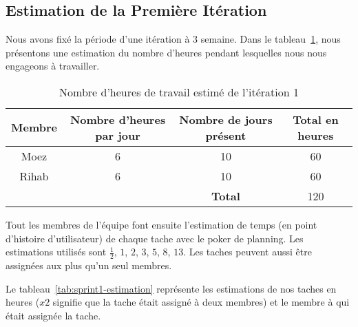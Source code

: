 \subsection{Estimation de la Première Itération}

Nous avons fixé la période d'une itération à 3 semaine. Dans le
tableau~\ref{tab:sprint1-capacity}, nous présentons une estimation du nombre
d'heures pendant lesquelles nous nous engageons à travailler.

\begin{table}[htbp]
    \centering
    \begin{tabular}{| c | c | c | c |}
        \hline
        \textbf{Membre} & \textbf{Nombre d'heures par jour} & \textbf{Nombre de jours présent} & \textbf{Total en heures} \\ \hline
        \hline

Moez & 6 & 10 & 60\\ \hline
Rihab & 6 & 10 & 60 \\ \hline
\multicolumn{2}{c|}{} & \textbf{Total} & 120 \\ \cline{3-4}
    \end{tabular}
    \caption{Nombre d'heures de travail estimé de l'itération 1}
    \label{tab:sprint1-capacity}
\end{table}

Tout les membres de l'équipe font ensuite l'estimation de temps (en point
d'histoire d'utilisateur) de chaque tache avec le poker de planning. Les
estimations utilisés sont $\frac{1}{2}$, $1$, $2$, $3$, $5$, $8$, $13$. Les
taches peuvent aussi être assignées aux plus qu'un seul membres.

Le tableau~\ref{tab:sprint1-estimation} représente les estimations de nos
taches en heures ($x2$ signifie que la tache était assigné à deux membres) et
le membre à qui était assignée la tache.

